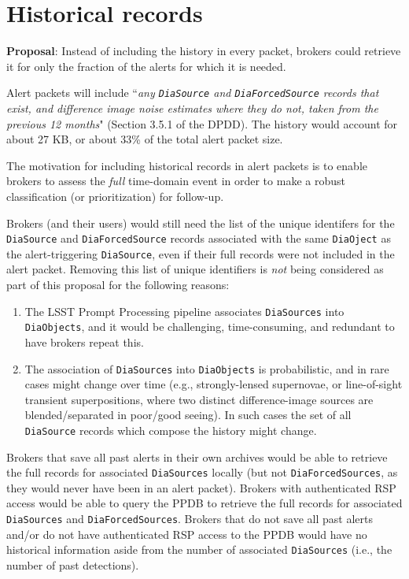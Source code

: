 \documentclass[DM,authoryear,toc]{lsstdoc}
\begin{document}
\section{Historical records}\label{sec:histories}

\textbf{Proposal}: Instead of including the history in every packet, brokers could retrieve it for only the fraction 
of the alerts for which it is needed.

Alert packets will include ``\textit{any \texttt{DiaSource} and \texttt{DiaForcedSource} records that exist, and difference image noise
estimates where they do not, taken from the previous 12 months}" (Section 3.5.1 of the DPDD).
The history would account for about 27 KB, or about 33\% of the total alert packet size.

The motivation for including historical records in alert packets is to enable brokers to assess the \emph{full} 
time-domain event in order to make a robust classification (or prioritization) for follow-up.

Brokers (and their users) would still need the list of the unique identifers for the \texttt{DiaSource} and \texttt{DiaForcedSource} 
records associated with the same \texttt{DiaOject} as the alert-triggering \texttt{DiaSource}, even if their full records were not included 
in the alert packet.
Removing this list of unique identifiers is \emph{not} being considered as part of this proposal for the following reasons:

\begin{enumerate}
\item The LSST Prompt Processing pipeline associates \texttt{DiaSources} into \texttt{DiaObjects}, and it would be challenging, time-consuming, 
and redundant to have brokers repeat this.
\item The association of \texttt{DiaSources} into \texttt{DiaObjects} is probabilistic, and in rare cases might change over time 
(e.g., strongly-lensed supernovae, or line-of-sight transient superpositions, where two distinct difference-image sources are 
blended/separated in poor/good seeing).
In such cases the set of all \texttt{DiaSource} records which compose the history might change.
\end{enumerate}

Brokers that save all past alerts in their own archives would be able to retrieve the full records for associated \texttt{DiaSources} 
locally (but not \texttt{DiaForcedSources}, as they would never have been in an alert packet).
Brokers with authenticated RSP access would be able to query the PPDB to retrieve the full records for associated \texttt{DiaSources} 
and \texttt{DiaForcedSources}.
Brokers that do not save all past alerts and/or do not have authenticated RSP access to the PPDB would have no historical 
information aside from the number of associated \texttt{DiaSources} (i.e., the number of past detections).
\end{document}
